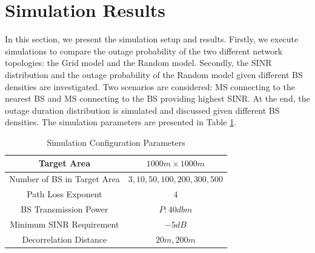 \documentclass[journal,10pt]{IEEEtran}
\begin{document}
 \section{Simulation Results}
 \label{4:SimuProb}
 \par In this section, we present the simulation setup and results. Firstly, we execute simulations to compare the outage probability of the two different network topologies: the Grid model and the Random model. Secondly, the SINR distribution and the outage probability of the Random model given different BS densities are investigated. Two scenarios are considered: MS connecting to the nearest BS and MS connecting to the BS providing highest SINR. At the end, the outage duration distribution is simulated and discussed given different BS densities. The simulation parameters are presented in Table \ref{SystemConfig2}. 
 \begin{table}
 \centering
 \caption{\label{SystemConfig2}Simulation Configuration Parameters}

 \begin{tabular}{|c|c|}

 \hline
 Target Area & $1000m\times 1000m$\\
 \hline
 Number of BS in Target Area& $3, 10, 50, 100, 200, 300, 500$\\
 \hline
 Path Loss Exponent & $4$\\
 \hline
 BS Transmission Power & $P: 40dbm$\\
 \hline
 Minimum SINR Requirement & $-5dB$\\
 \hline
 Decorrelation Distance & $20m, 200m$\\
 \hline
 \end{tabular}

 \end{table}
\end{document}
